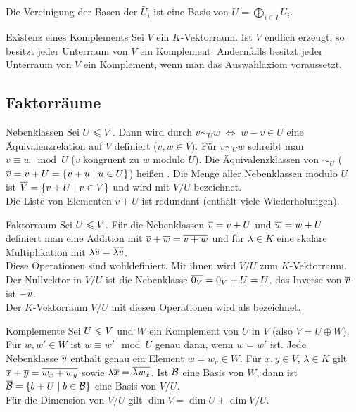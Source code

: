 \begin{Kor}
    Die Vereinigung der Basen der $\widetilde{U_i}$ ist eine Basis
    von $U = \bigoplus_{i \in I} U_i$.
\end{Kor}

\begin{Satz}{Existenz eines Komplements}
    Sei $V$ ein $K$-Vektorraum.
    Ist $V$ endlich erzeugt, so besitzt jeder Unterraum von $V$ ein Komplement.
    Andernfalls besitzt jeder Unterraum von $V$ ein Komplement, wenn man
    das Auswahlaxiom voraussetzt.
\end{Satz}

\subsection{%
    Faktorräume%
}

\begin{Def}{Nebenklassen}
    Sei $U \leqslant V$.
    Dann wird durch $v \sim_U w \;\Leftrightarrow\; w - v \in U$ eine
    Äquivalenzrelation auf $V$ definiert ($v, w \in V$).
    Für $v \sim_U w$ schreibt man $v \equiv w \mod U$
    ($v$ kongruent zu $w$ modulo $U$).
    Die Äquivalenzklassen von $\sim_U$
    ($\overline{v} = v + U = \{v + u \;|\; u \in U\}$) heißen
    .
    Die Menge aller Nebenklassen modulo $U$ ist
    $\overline{V} = \{v + U \;|\; v \in V\}$ und wird mit $V/U$ bezeichnet. \\
    Die Liste von Elementen $v + U$ ist redundant (enthält viele
    Wiederholungen).
\end{Def}

\begin{Def}{Faktorraum}
    Sei $U \leqslant V$.
    Für die Nebenklassen $\overline{v} = v + U$ und $\overline{w} = w + U$
    definiert man eine Addition mit
    $\overline{v} + \overline{w} = \overline{v + w}$ und für $\lambda \in K$
    eine skalare Multiplikation mit
    $\lambda \overline{v} = \overline{\lambda v}$. \\
    Diese Operationen sind wohldefiniert.
    Mit ihnen wird $V/U$ zum $K$-Vektorraum. \\
    Der Nullvektor in $V/U$ ist die Nebenklasse
    $\overline{0_V} = 0_V + U = U$, das Inverse von $\overline{v}$ ist $\overline{-v}$. \\
    Der $K$-Vektorraum $V/U$ mit diesen Operationen wird als
     bezeichnet.
\end{Def}

\begin{Satz}{Komplemente}
    Sei $U \leqslant V$ und $W$ ein Komplement von $U$ in $V$ (also
    $V = U \oplus W$). \\
    Für $w, w' \in W$ ist $w \equiv w' \mod U$ genau dann, wenn $w = w'$ ist.
    Jede Nebenklasse $\overline{v}$ enthält genau ein Element $w = w_v \in W$.
    Für $x, y \in V$, $\lambda \in K$ gilt
    $\overline{x} + \overline{y} = \overline{w_x + w_y}$ sowie
    $\lambda \overline{x} = \overline{\lambda w_x}$.
    Ist $\mathcal{B}$ eine Basis von $W$, dann ist
    $\overline{\mathcal{B}} = \{b + U \;|\; b \in \mathcal{B}\}$ eine Basis
    von $V/U$. \\
    Für die Dimension von $V/U$ gilt
    $\dim V = \dim U + \dim V/U$.
\end{Satz}

